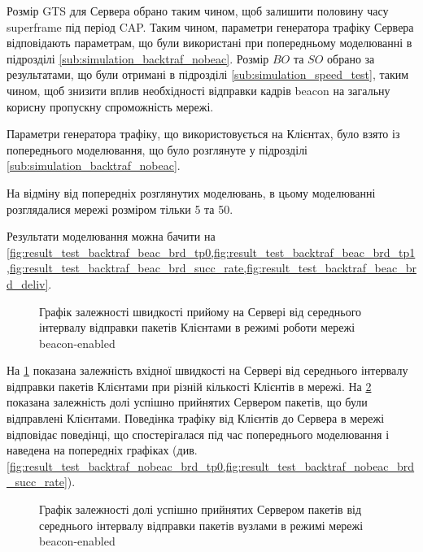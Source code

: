 \documentclass[a4paper,ukrainian,utf8,nocolumnsxix,floatsection,equationsection]{eskdtext}
\newcommand{\longcaption}[1]{\captionsetup{style=figureLongCaption}\caption{#1}}
\newcommand{\bem}[0]{beacon-enabled\xspace}
\begin{document}
Розмір GTS для Сервера обрано таким чином, щоб залишити половину часу superframe під період CAP. Таким чином, параметри генератора  трафіку Сервера  відповідають параметрам, що були використані при попередньому моделюванні в підрозділі \ref{sub:simulation_backtraf_nobeac}. Розмір $BO$ та $SO$ обрано за результатами, що були отримані в підрозділі \ref{sub:simulation_speed_test}, таким чином, щоб знизити вплив необхідності відправки кадрів beacon на загальну корисну пропускну спроможність мережі.

Параметри генератора трафіку, що використовується на Клієнтах, було взято із попереднього моделювання, що було розглянуте у підрозділі \ref{sub:simulation_backtraf_nobeac}.

На відміну від попередніх розглянутих моделювань, в цьому моделюванні розглядалися мережі розміром тільки 5 та 50. %

Результати моделювання можна бачити на \cref{fig:result_test_backtraf_beac_brd_tp0,fig:result_test_backtraf_beac_brd_tp1,fig:result_test_backtraf_beac_brd_succ_rate,fig:result_test_backtraf_beac_brd_deliv}.

\begin{figure}[hbp]
	\centering
	\longcaption{\label{fig:result_test_backtraf_beac_brd_tp0}Графік залежності швидкості прийому на Сервері від середнього інтервалу відправки пакетів Клієнтами в режимі роботи мережі \bem}
\end{figure}

На \cref{fig:result_test_backtraf_beac_brd_tp0} показана залежність вхідної швидкості на Сервері від середнього інтервалу відправки пакетів Клієнтами при різній кількості Клієнтів в мережі. На \cref{fig:result_test_backtraf_beac_brd_succ_rate} показана залежність долі успішно прийнятих Сервером пакетів, що були відправлені Клієнтами. Поведінка трафіку від Клієнтів до Сервера в мережі відповідає поведінці, що спостерігалася під час попереднього моделювання і наведена на попередніх графіках (див.  \cref{fig:result_test_backtraf_nobeac_brd_tp0,fig:result_test_backtraf_nobeac_brd_succ_rate}). 

\begin{figure}[hbp]
	\centering
	\caption{\label{fig:result_test_backtraf_beac_brd_succ_rate}Графік залежності долі успішно прийнятих Сервером пакетів від середнього інтервалу відправки пакетів вузлами в режимі мережі \bem}
\end{figure}
\end{document}
